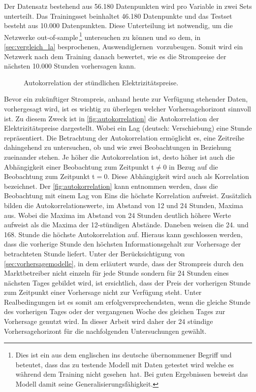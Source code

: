 Der Datensatz bestehend aus 56.180 Datenpunkten wird pro Variable in zwei Sets unterteilt. Das Trainingsset beinhaltet 46.180 Datenpunkte und das Testset besteht aus 10.000 Datenpunkten. Diese Unterteilung ist notwendig, um die Netzwerke out-of-sample\,\footnote{Dies ist ein aus dem englischen ins deutsche übernommener Begriff und beteutet, dass das zu testende Modell mit Daten getestet wird welche es während dem Training nicht \glqq gesehen\grqq~hat. Bei guten Ergebnissen beweist das Modell damit seine Generalisierungsfähigkeit.} untersuchen zu können und so dem, in \autoref{sec:vergleich_la} besprochenen, \glqq Auswendiglernen\grqq~vorzubeugen. Somit wird ein Netzwerk nach dem Training danach bewertet, wie es die Strompreise der nächsten 10.000 Stunden vorhersagen kann.

\begin{figure}[!htb]
    \centering
        
    \caption{Autokorrelation der stündlichen Elektrizitätspreise.}
    \label{fig:autokorrelation}
\end{figure}

Bevor ein zukünftiger Strompreis, anhand heute zur Verfügung stehender Daten, vorhergesagt wird, ist es wichtig zu überlegen welcher Vorhersagehorizont sinnvoll ist.
Zu diesem Zweck ist in \autoref{fig:autokorrelation} die Autokorrelation der Elektrizitätspreise dargestellt. Wobei ein Lag (deutsch: Verschiebung) eine Stunde repräsentiert. Die Betrachtung der Autokorrelation ermöglicht es, eine Zeitreihe dahingehend zu untersuchen, ob und wie zwei Beobachtungen in Beziehung zueinander stehen. Je höher die Autokorrelation ist, desto höher ist auch die Abhängigkeit einer Beobachtung zum Zeitpunkt t$\neq$0 in Bezug auf die Beobachtung zum Zeitpunkt t$=$0. Diese Abhängigkeit wird auch als Korrelation bezeichnet. Der \autoref{fig:autokorrelation} kann entnommen werden, dass die Beobachtung mit einem Lag von Eins die höchste Korrelation aufweist. Zusätzlich bilden die Autokorrelationswerte, im Abstand von 12 und 24 Stunden, Maxima aus. Wobei die Maxima im Abstand von 24 Stunden deutlich höhere Werte aufweist als die Maxima der 12-stündigen Abstände. Daneben weisen die 24. und 168. Stunde die höchste Autokorrelation auf. 
Hieraus kann geschlossen werden, dass die vorherige Stunde den höchsten Informationsgehalt zur Vorhersage der betrachteten Stunde liefert. Unter der Berücksichtigung von \autoref{sec:vorhersagemodelle}, in dem erläutert wurde, dass der Strompreis durch den Marktbetreiber nicht einzeln für jede Stunde sondern für 24 Stunden eines nächsten Tages gebildet wird, ist ersichtlich, dass der Preis der vorherigen Stunde zum Zeitpunkt einer Vorhersage nicht zur Verfügung steht. Unter Realbedingungen ist es somit am erfolgversprechendsten, wenn die gleiche Stunde des vorherigen Tages oder der vergangenen Woche des gleichen Tages zur Vorhersage genutzt wird. In dieser Arbeit wird daher der 24 stündige Vorhersagehorizont für die nachfolgenden Untersuchungen gewählt.


